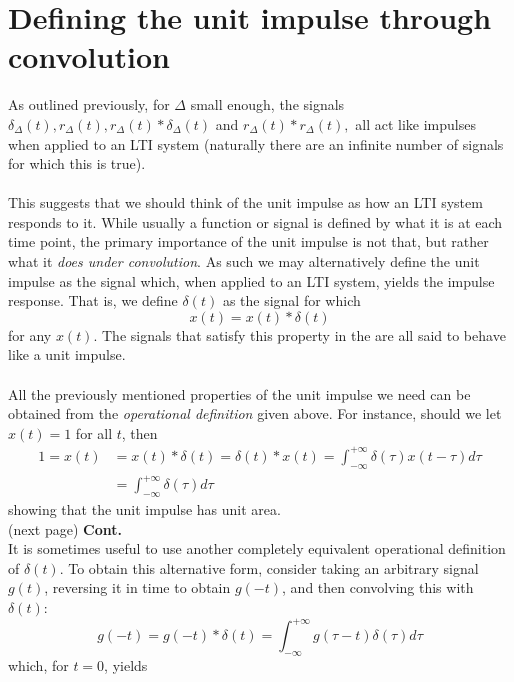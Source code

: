 \documentclass{report}
\begin{document}
\section{Defining the unit impulse through convolution}
As outlined previously, for $\Delta$ small enough, the signals $\delta_\Delta(t), r_\Delta(t), r_\Delta(t)*\delta_\Delta(t)$ and $ r_\Delta(t)*r_\Delta(t),$ all act like impulses when applied to an 
LTI system (naturally there are an infinite number of signals for which this is true).\\
\vspace{1mm}\\
This suggests that we should think of the unit impulse as how an LTI system responds to it. While usually a function or signal is defined by what it is at each time point, the primary importance
of the unit impulse is not that, but rather what it \textit{does under convolution}. As such we may alternatively define the unit impulse as the signal which, when applied to an LTI system, yields
the impulse response. That is, we define $\delta(t)$ as the signal for which
\begin{equation*}
x(t)=x(t)*\delta(t)
\end{equation*}
for any $x(t)$. The signals that satisfy this property in the are all said to behave like a unit impulse.\\
\vspace{1mm}\\
All the previously mentioned properties of the unit impulse we need can be obtained from the \textit{operational definition} given above. For instance, should we let
$x(t)=1$ for all $t$, then
\begin{align*}
1=x(t)&=x(t)*\delta(t)=\delta(t)*x(t)=\int^{+\infty}_{-\infty}\delta(\tau)x(t-\tau)d\tau\\
&=\int^{+\infty}_{-\infty}\delta(\tau)d\tau
\end{align*}
showing that the unit impulse has unit area.\\
(next page)\newpage
\noindent\textbf{Cont.}\\
It is sometimes useful to use another completely equivalent operational definition of $\delta(t)$. To obtain this alternative form, consider taking an arbitrary signal $g(t)$, reversing it
in time to obtain $g(-t)$, and then convolving this with $\delta(t)$:
\begin{equation*}
g(-t)=g(-t)*\delta(t)=\int^{+\infty}_{-\infty}g(\tau-t)\delta(\tau)d\tau
\end{equation*}
which, for $t=0$, yields
\end{document}
